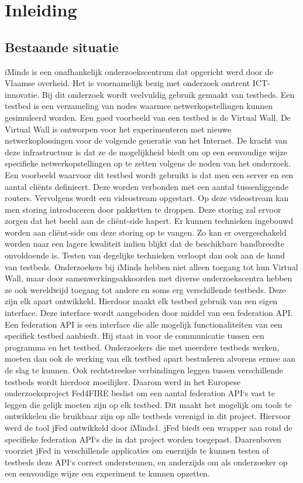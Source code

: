 \newpage
\chapter{Inleiding}
\section{Bestaande situatie}
\npar
iMinds is een onafhankelijk onderzoekscentrum dat opgericht werd door de Vlaamse overheid.
Het is voornamelijk bezig met onderzoek omtrent ICT-innovatie. Bij dit onderzoek wordt veelvuldig gebruik gemaakt van testbeds. Een testbed is een verzameling van nodes waarmee netwerkopstellingen kunnen gesimuleerd worden. 
\npar
Een goed voorbeeld van een testbed is de Virtual Wall. De Virtual Wall is ontworpen voor het experimenteren met nieuwe netwerkoplossingen voor de volgende generatie van het Internet. De kracht van deze infrastructuur is dat ze de mogelijkheid biedt om op een eenvoudige wijze specifieke netwerkopstellingen op te zetten volgens de noden van het onderzoek. 
\npar
Een voorbeeld waarvoor dit testbed wordt gebruikt is dat men een server en een aantal cli\"ents definieert. Deze worden verbonden met een aantal tussenliggende routers. Vervolgens wordt een videostream opgestart. Op deze videostream kan men storing introduceren door pakketten te droppen. Deze storing zal ervoor zorgen dat het beeld aan de cliënt-side hapert. Er kunnen technieken ingebouwd worden aan cli\"ent-side om deze storing op te vangen. Zo kan er overgeschakeld worden naar een lagere kwaliteit indien blijkt dat de beschikbare bandbreedte onvoldoende is. Testen van degelijke technieken verloopt dan ook aan de hand van testbeds.
\npar
Onderzoekers bij iMinds hebben niet alleen toegang tot hun Virtual Wall, maar door samenwerkingsakkoorden met diverse onderzoekscentra hebben ze ook wereldwijd toegang tot andere en soms erg verschillende testbeds. Deze zijn elk apart ontwikkeld. Hierdoor maakt elk testbed gebruik van een eigen interface. Deze interface wordt aangeboden door middel van een federation API. Een federation API is een interface die alle mogelijk functionaliteiten van een specifiek testbed aanbiedt. Hij staat in voor de communicatie tussen een programma en het testbed. Onderzoekers die met meerdere testbeds werken, moeten dan ook de werking van elk testbed apart bestuderen alvorens ermee aan de slag te kunnen. Ook rechtstreekse verbindingen leggen tussen verschillende testbeds wordt hierdoor moeilijker. 
\npar
Daarom werd in het Europese onderzoeksproject Fed4FIRE beslist om een aantal federation API\lq s vast te leggen die gelijk moeten zijn op elk testbed. Dit maakt het mogelijk om tools te ontwikkelen die bruikbaar zijn op alle testbeds verenigd in dit project. Hiervoor werd de tool jFed ontwikkeld door iMinds1. jFed biedt een wrapper aan rond de specifieke federation API\lq s die in dat project worden toegepast. Daarenboven voorziet jFed in verschillende applicaties om enerzijds te kunnen testen of testbeds deze API\lq s correct ondersteunen, en anderzijds om als onderzoeker op een eenvoudige wijze een experiment te kunnen opzetten. 
